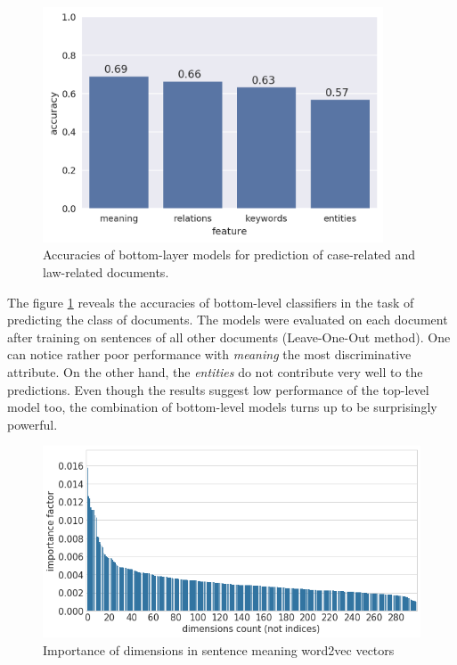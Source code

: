 \documentclass[
  digital, %
  table,   %
  lof,     %
  lot,     %
]{fithesis3}
\begin{document}
\begin{figure}[h]
\caption{Accuracies of bottom-layer models for prediction of case-related and law-related documents.}
\label{fig:Case-Law_accuracies}
\includegraphics[width=0.9\textwidth]{img/Case-Law_accuracies}
\end{figure}

The figure \ref{fig:Case-Law_accuracies} reveals the accuracies of bottom-level classifiers in the task of predicting the class of documents.
The models were evaluated on each document after training on sentences of all other documents (Leave-One-Out method).
One can notice rather poor performance with \textit{meaning} the most discriminative attribute.
On the other hand, the \textit{entities} do not contribute very well to the predictions.
Even though the results suggest low performance of the top-level model too, the combination of bottom-level models turns up to be surprisingly powerful.

\begin{figure}[h]
\caption{Importance of dimensions in sentence meaning word2vec vectors}
\label{fig:vec_importance_caselaw}
\includegraphics[width=\textwidth]{img/vec_importance_caselaw}
\end{figure}
\end{document}
